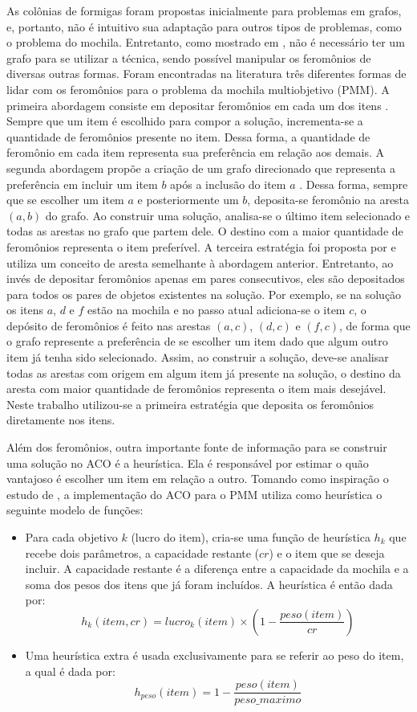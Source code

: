 As colônias de formigas foram propostas inicialmente para problemas em grafos, e, portanto, não é intuitivo sua adaptação para outros tipos de problemas, como o problema do mochila. Entretanto, como mostrado em \cite{Ke2010}, não é necessário ter um grafo para se utilizar a técnica, sendo possível manipular os feromônios de diversas outras formas. Foram encontradas na literatura três diferentes formas de lidar com os feromônios para o problema da mochila multiobjetivo (PMM). A primeira abordagem consiste em depositar feromônios em cada um dos itens \cite{Leguizamon1999}. Sempre que um item é escolhido para compor a solução, incrementa-se a quantidade de feromônios presente no item. Dessa forma, a quantidade de feromônio em cada item representa sua preferência em relação aos demais. A segunda abordagem propõe a criação de um grafo direcionado que representa a preferência em incluir um item $b$ após a inclusão do item $a$ \cite{Fidanova2003}. Dessa forma, sempre que se escolher um item $a$ e posteriormente um $b$, deposita-se feromônio na aresta $(a,b)$ do grafo. Ao construir uma solução, analisa-se o último item selecionado e todas as arestas no grafo que partem dele. O destino com a maior quantidade de feromônios representa o item preferível. A terceira estratégia foi proposta por \cite{Alaya2004} e utiliza um conceito de aresta semelhante à abordagem anterior. Entretanto, ao invés de depositar feromônios apenas em pares consecutivos, eles são depositados para todos os pares de objetos existentes na solução. Por exemplo, se na solução os itens $a$, $d$ e $f$ estão na mochila e no passo atual adiciona-se o item $c$, o depósito de feromônios é feito nas arestas $(a,c)$, $(d,c)$ e $(f,c)$, de forma que o grafo represente a preferência de se escolher um item dado que algum outro item já tenha sido selecionado. Assim, ao construir a solução, deve-se analisar todas as arestas com origem em algum item já presente na solução, o destino da aresta com maior quantidade de feromônios representa o item mais desejável. Neste trabalho utilizou-se a primeira estratégia que deposita os feromônios diretamente nos itens.

Além dos feromônios, outra importante fonte de informação para se construir uma solução no ACO é a heurística. Ela é responsável por estimar o quão vantajoso é escolher um item em relação a outro. Tomando como inspiração o estudo de \cite{Ke2010}, a implementação do ACO para o PMM utiliza como heurística o seguinte modelo de funções:

\begin{itemize}
	\item Para cada objetivo $k$ (lucro do item), cria-se uma função de heurística $h_k$ que recebe dois parâmetros, a capacidade restante ($cr$) e o item que se deseja incluir. A capacidade restante é a diferença entre a capacidade da mochila e a soma dos pesos dos itens que já foram incluídos. A heurística é então dada por: \[h_k(item, cr) = lucro_k(item) \times (1 - \frac{peso(item)}{cr})\]
	\item Uma heurística extra é usada exclusivamente para se referir ao peso do item, a qual é dada por: \[h_{peso}(item) = 1 - \frac{peso(item)}{peso\_maximo}\]
\end{itemize}

